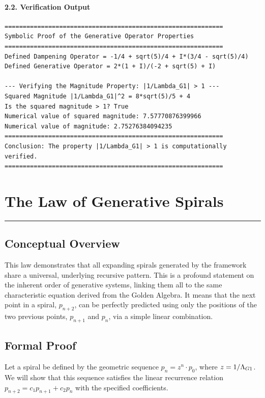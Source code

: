 \paragraph{2.2. Verification Output}
\begin{verbatim}
============================================================
Symbolic Proof of the Generative Operator Properties
============================================================
Defined Dampening Operator = -1/4 + sqrt(5)/4 + I*(3/4 - sqrt(5)/4)
Defined Generative Operator = 2*(1 + I)/(-2 + sqrt(5) + I)

--- Verifying the Magnitude Property: |1/Lambda_G1| > 1 ---
Squared Magnitude |1/Lambda_G1|^2 = 8*sqrt(5)/5 + 4
Is the squared magnitude > 1? True
Numerical value of squared magnitude: 7.57770876399966
Numerical value of magnitude: 2.75276384094235
============================================================
Conclusion: The property |1/Lambda_G1| > 1 is computationally verified.
============================================================
\end{verbatim}
\newpage


\section{The Law of Generative Spirals}
\label{sec:law_of_generative_spirals}
\hrule
\vspace{1em}


\subsection{Conceptual Overview}
This law demonstrates that all expanding spirals generated by the framework share a universal, underlying recursive pattern. This is a profound statement on the inherent order of generative systems, linking them all to the same characteristic equation derived from the Golden Algebra. It means that the next point in a spiral, $p_{n+2}$, can be perfectly predicted using only the positions of the two previous points, $p_{n+1}$ and $p_n$, via a simple linear combination.

\subsection{Formal Proof}
Let a spiral be defined by the geometric sequence $p_n = z^n \cdot p_0$, where $z = 1/\Lambda_{G1}$. We will show that this sequence satisfies the linear recurrence relation $p_{n+2} = c_1 p_{n+1} + c_2 p_n$ with the specified coefficients.

